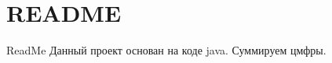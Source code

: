 \chapter{README}
\hypertarget{md__r_e_a_d_m_e}{}\label{md__r_e_a_d_m_e}
Read\+Me Данный проект основан на коде java. Суммируем цмфры. 